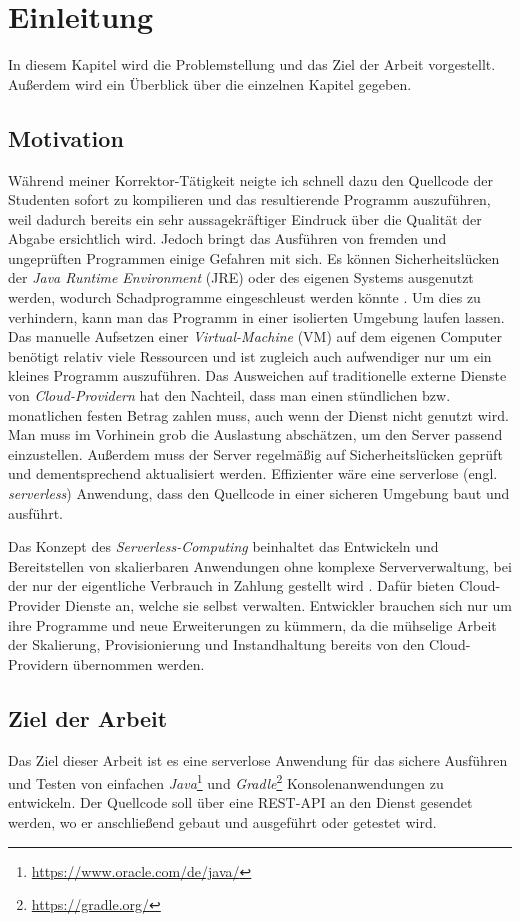 \chapter{Einleitung}
In diesem Kapitel wird die Problemstellung und das Ziel der Arbeit vorgestellt.
Außerdem wird ein Überblick über die einzelnen Kapitel gegeben.

\section{Motivation}
Während meiner Korrektor-Tätigkeit neigte ich schnell dazu den Quellcode der Studenten sofort zu kompilieren
und das resultierende Programm auszuführen, 
weil dadurch bereits ein sehr aussagekräftiger Eindruck über die Qualität der Abgabe ersichtlich wird. 
Jedoch bringt das Ausführen von fremden und ungeprüften Programmen einige Gefahren mit sich.
Es können Sicherheitslücken der \textit{Java Runtime Environment} (JRE) \cite{Jre}
oder des eigenen Systems ausgenutzt werden, wodurch Schadprogramme eingeschleust
werden könnte \cite{CveJreVuln}.
Um dies zu verhindern, kann man das Programm in einer isolierten Umgebung laufen lassen.
Das manuelle Aufsetzen einer \textit{Virtual-Machine} (VM) \cite{RedHatVM} auf dem eigenen Computer
benötigt relativ viele Ressourcen und ist zugleich auch aufwendiger nur um ein kleines Programm auszuführen.
Das Ausweichen auf traditionelle externe Dienste von \textit{Cloud-Providern} hat den Nachteil,
dass man einen stündlichen bzw. monatlichen festen Betrag zahlen muss,
auch wenn der Dienst nicht genutzt wird. Man muss im Vorhinein grob die Auslastung abschätzen,
um den Server passend einzustellen. Außerdem muss der Server regelmäßig auf
Sicherheitslücken geprüft und dementsprechend aktualisiert werden.
Effizienter wäre eine serverlose (engl. \textit{serverless}) Anwendung, dass den
Quellcode in einer sicheren Umgebung baut und ausführt.

Das Konzept des \textit{Serverless-Computing} beinhaltet das Entwickeln und Bereitstellen
von skalierbaren Anwendungen ohne komplexe Serververwaltung, bei der nur der eigentliche Verbrauch
in Zahlung gestellt wird \cite{CioGov}.
Dafür bieten Cloud-Provider Dienste an, welche sie selbst
verwalten. Entwickler brauchen sich nur um ihre Programme und neue Erweiterungen zu kümmern,
da die mühselige Arbeit der Skalierung, Provisionierung und Instandhaltung
bereits von den Cloud-Providern übernommen werden.

\section{Ziel der Arbeit}
Das Ziel dieser Arbeit ist es eine serverlose Anwendung für das sichere Ausführen und Testen
von einfachen \textit{Java}\footnote{\url{https://www.oracle.com/de/java/}} und
\textit{Gradle}\footnote{\url{https://gradle.org/}} Konsolenanwendungen zu entwickeln.
Der Quellcode soll über eine
REST-API an den Dienst gesendet werden, wo er anschließend gebaut und ausgeführt oder getestet
wird.


